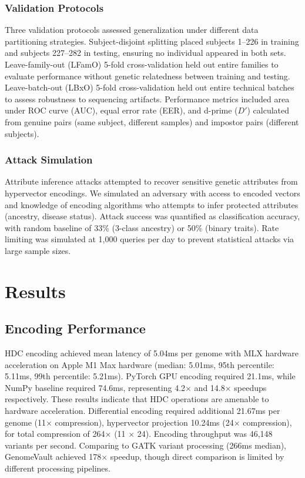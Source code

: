 \documentclass[11pt,letterpaper]{article}
\begin{document}
\subsubsection{Validation Protocols}

Three validation protocols assessed generalization under different data partitioning strategies. Subject-disjoint splitting placed subjects 1--226 in training and subjects 227--282 in testing, ensuring no individual appeared in both sets. Leave-family-out (LFamO) 5-fold cross-validation held out entire families to evaluate performance without genetic relatedness between training and testing. Leave-batch-out (LBxO) 5-fold cross-validation held out entire technical batches to assess robustness to sequencing artifacts. Performance metrics included area under ROC curve (AUC), equal error rate (EER), and d-prime ($D'$) calculated from genuine pairs (same subject, different samples) and impostor pairs (different subjects).

\subsubsection{Attack Simulation}

Attribute inference attacks attempted to recover sensitive genetic attributes from hypervector encodings. We simulated an adversary with access to encoded vectors and knowledge of encoding algorithms who attempts to infer protected attributes (ancestry, disease status). Attack success was quantified as classification accuracy, with random baseline of 33\% (3-class ancestry) or 50\% (binary traits). Rate limiting was simulated at 1,000 queries per day to prevent statistical attacks via large sample sizes.

\section{Results}

\subsection{Encoding Performance}

HDC encoding achieved mean latency of 5.04ms per genome with MLX hardware acceleration on Apple M1 Max hardware (median: 5.01ms, 95th percentile: 5.11ms, 99th percentile: 5.21ms). PyTorch GPU encoding required 21.1ms, while NumPy baseline required 74.6ms, representing 4.2$\times$ and 14.8$\times$ speedups respectively. These results indicate that HDC operations are amenable to hardware acceleration. Differential encoding required additional 21.67ms per genome (11$\times$ compression), hypervector projection 10.24ms (24$\times$ compression), for total compression of 264$\times$ (11 $\times$ 24). Encoding throughput was 46,148 variants per second. Comparing to GATK variant processing (266ms median), GenomeVault achieved 178$\times$ speedup, though direct comparison is limited by different processing pipelines.
\end{document}
